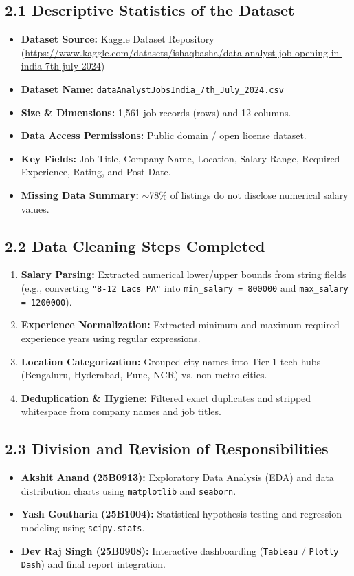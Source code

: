 \documentclass[11pt, a4paper]{article}
\begin{document}
\subsection*{2.1 Descriptive Statistics of the Dataset}
\begin{itemize}
    \item \textbf{Dataset Source:} Kaggle Dataset Repository (\url{https://www.kaggle.com/datasets/ishaqbasha/data-analyst-job-opening-in-india-7th-july-2024})
    \item \textbf{Dataset Name:} \texttt{dataAnalystJobsIndia\_7th\_July\_2024.csv}
    \item \textbf{Size \& Dimensions:} 1,561 job records (rows) and 12 columns.
    \item \textbf{Data Access Permissions:} Public domain / open license dataset.
    \item \textbf{Key Fields:} Job Title, Company Name, Location, Salary Range, Required Experience, Rating, and Post Date.
    \item \textbf{Missing Data Summary:} $\sim$78\% of listings do not disclose numerical salary values.
\end{itemize}

\subsection*{2.2 Data Cleaning Steps Completed}
\begin{enumerate}
    \item \textbf{Salary Parsing:} Extracted numerical lower/upper bounds from string fields (e.g., converting \texttt{"8-12 Lacs PA"} into \texttt{min\_salary = 800000} and \texttt{max\_salary = 1200000}).
    \item \textbf{Experience Normalization:} Extracted minimum and maximum required experience years using regular expressions.
    \item \textbf{Location Categorization:} Grouped city names into Tier-1 tech hubs (Bengaluru, Hyderabad, Pune, NCR) vs. non-metro cities.
    \item \textbf{Deduplication \& Hygiene:} Filtered exact duplicates and stripped whitespace from company names and job titles.
\end{enumerate}

\subsection*{2.3 Division and Revision of Responsibilities}
\begin{itemize}
    \item \textbf{Akshit Anand (25B0913):} Exploratory Data Analysis (EDA) and data distribution charts using \texttt{matplotlib} and \texttt{seaborn}.
    \item \textbf{Yash Goutharia (25B1004):} Statistical hypothesis testing and regression modeling using \texttt{scipy.stats}.
    \item \textbf{Dev Raj Singh (25B0908):} Interactive dashboarding (\texttt{Tableau} / \texttt{Plotly Dash}) and final report integration.
\end{itemize}
\end{document}
